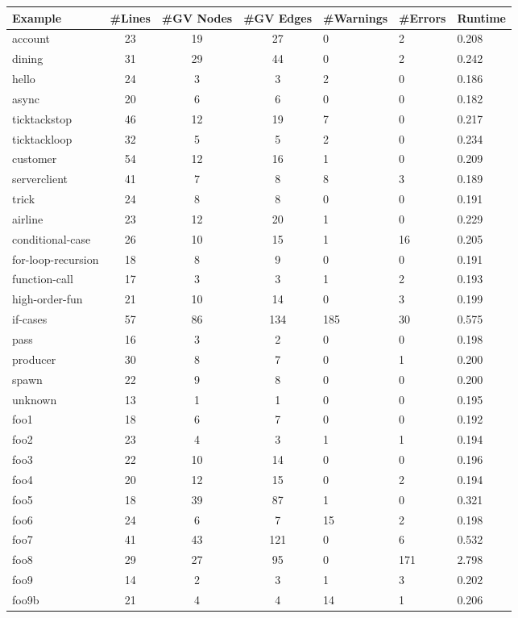 \begin{table}[h]
\centering
\begin{tabular}{lccc}
\hline
Example & #Lines & #GV Nodes & #GV Edges & #Warnings & #Errors & Runtime \\ 
\hline
account & 23 & 19 & 27 & 0 & 2 & 0.208 \\ 
dining & 31 & 29 & 44 & 0 & 2 & 0.242 \\ 
hello & 24 & 3 & 3 & 2 & 0 & 0.186 \\ 
async & 20 & 6 & 6 & 0 & 0 & 0.182 \\ 
ticktackstop & 46 & 12 & 19 & 7 & 0 & 0.217 \\ 
ticktackloop & 32 & 5 & 5 & 2 & 0 & 0.234 \\ 
customer & 54 & 12 & 16 & 1 & 0 & 0.209 \\ 
serverclient & 41 & 7 & 8 & 8 & 3 & 0.189 \\ 
trick & 24 & 8 & 8 & 0 & 0 & 0.191 \\ 
airline & 23 & 12 & 20 & 1 & 0 & 0.229 \\ 
conditional-case & 26 & 10 & 15 & 1 & 16 & 0.205 \\ 
for-loop-recursion & 18 & 8 & 9 & 0 & 0 & 0.191 \\ 
function-call & 17 & 3 & 3 & 1 & 2 & 0.193 \\ 
high-order-fun & 21 & 10 & 14 & 0 & 3 & 0.199 \\ 
if-cases & 57 & 86 & 134 & 185 & 30 & 0.575 \\ 
pass & 16 & 3 & 2 & 0 & 0 & 0.198 \\ 
producer & 30 & 8 & 7 & 0 & 1 & 0.200 \\ 
spawn & 22 & 9 & 8 & 0 & 0 & 0.200 \\ 
unknown & 13 & 1 & 1 & 0 & 0 & 0.195 \\ 
foo1 & 18 & 6 & 7 & 0 & 0 & 0.192 \\ 
foo2 & 23 & 4 & 3 & 1 & 1 & 0.194 \\ 
foo3 & 22 & 10 & 14 & 0 & 0 & 0.196 \\ 
foo4 & 20 & 12 & 15 & 0 & 2 & 0.194 \\ 
foo5 & 18 & 39 & 87 & 1 & 0 & 0.321 \\ 
foo6 & 24 & 6 & 7 & 15 & 2 & 0.198 \\ 
foo7 & 41 & 43 & 121 & 0 & 6 & 0.532 \\ 
foo8 & 29 & 27 & 95 & 0 & 171 & 2.798 \\ 
foo9 & 14 & 2 & 3 & 1 & 3 & 0.202 \\ 
foo9b & 21 & 4 & 4 & 14 & 1 & 0.206 \\ 

\end{tabular}
\end{table}
